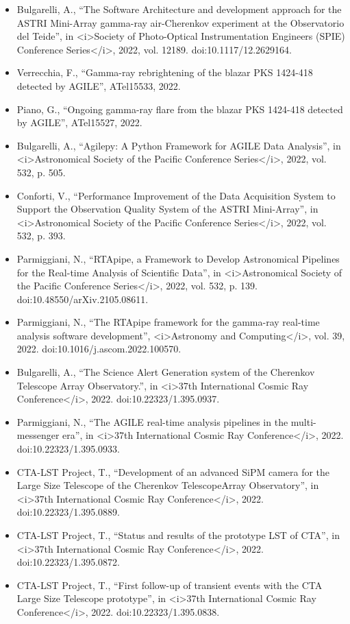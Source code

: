 \begin{itemize}
\item Bulgarelli, A., “The Software Architecture and development approach for the ASTRI Mini-Array gamma-ray air-Cherenkov experiment at the Observatorio del Teide”, in <i>Society of Photo-Optical Instrumentation Engineers (SPIE) Conference Series</i>, 2022, vol. 12189. doi:10.1117/12.2629164.
\item Verrecchia, F., “Gamma-ray rebrightening of the blazar PKS 1424-418 detected by AGILE”, ATel15533, 2022.
\item Piano, G., “Ongoing gamma-ray flare from the blazar PKS 1424-418 detected by AGILE”, ATel15527, 2022.
\item Bulgarelli, A., “Agilepy: A Python Framework for AGILE Data Analysis”, in <i>Astronomical Society of the Pacific Conference Series</i>, 2022, vol. 532, p. 505.
\item Conforti, V., “Performance Improvement of the Data Acquisition System to Support the Observation Quality System of the ASTRI Mini-Array”, in <i>Astronomical Society of the Pacific Conference Series</i>, 2022, vol. 532, p. 393.
\item Parmiggiani, N., “RTApipe, a Framework to Develop Astronomical Pipelines for the Real-time Analysis of Scientific Data”, in <i>Astronomical Society of the Pacific Conference Series</i>, 2022, vol. 532, p. 139. doi:10.48550/arXiv.2105.08611.
\item Parmiggiani, N., “The RTApipe framework for the gamma-ray real-time analysis software development”, <i>Astronomy and Computing</i>, vol. 39, 2022. doi:10.1016/j.ascom.2022.100570.
\item Bulgarelli, A., “The Science Alert Generation system of the Cherenkov Telescope Array Observatory.”, in <i>37th International Cosmic Ray Conference</i>, 2022. doi:10.22323/1.395.0937.
\item Parmiggiani, N., “The AGILE real-time analysis pipelines in the multi-messenger era”, in <i>37th International Cosmic Ray Conference</i>, 2022. doi:10.22323/1.395.0933.
\item CTA-LST Project, T., “Development of an advanced SiPM camera for the Large Size Telescope of the Cherenkov TelescopeArray Observatory”, in <i>37th International Cosmic Ray Conference</i>, 2022. doi:10.22323/1.395.0889.
\item CTA-LST Project, T., “Status and results of the prototype LST of CTA”, in <i>37th International Cosmic Ray Conference</i>, 2022. doi:10.22323/1.395.0872.
\item CTA-LST Project, T., “First follow-up of transient events with the CTA Large Size Telescope prototype”, in <i>37th International Cosmic Ray Conference</i>, 2022. doi:10.22323/1.395.0838.

\end{itemize}
